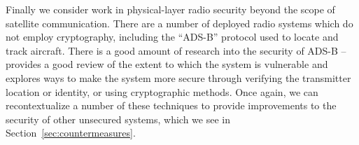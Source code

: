 Finally we consider work in physical-layer radio security beyond the scope of satellite communication.
There are a number of deployed radio systems which do not employ cryptography, including the ``ADS-B'' protocol used to locate and track aircraft.
There is a good amount of research into the security of ADS-B -- \cite{strohmeierSecurity2015} provides a good review of the extent to which the system is vulnerable and explores ways to make the system more secure through verifying the transmitter location or identity, or using cryptographic methods.
Once again, we can recontextualize a number of these techniques to provide improvements to the security of other unsecured systems, which we see in Section~\ref{sec:countermeasures}.

